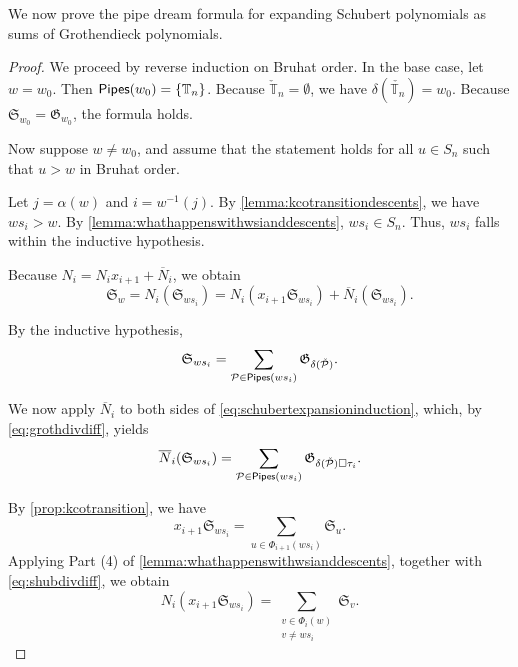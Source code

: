 \documentclass[12 pt]{amsart}
\newcommand{\addable}{\alpha}
\numberwithin{equation}{section}
\theoremstyle{remark}
\newcommand{\pipes}{{\sf Pipes}}
\newcommand{\demprod}{\delta}
\newcommand{\divdiff}{N}
\newcommand{\kdivdiff}{\overline{N}}
\newcommand{\cotransitionperms}{\Phi}
\begin{document}
		We now prove the pipe dream formula for expanding Schubert polynomials as sums of Grothendieck polynomials.
		\thmpipeB*
		\begin{proof}
			We proceed by reverse induction on Bruhat order. 
			In the base case, let $w = w_0$.
			Then $\pipes(w_0)=\{\mathbb{T}_n\}$. Because $\check{\mathbb{T}}_n = \emptyset$, we have $\demprod(\check{\mathbb{T}_n})=w_0$. Because $\mathfrak{S}_{w_0}=\mathfrak{G}_{w_0}$, the formula holds.
			
			Now suppose $w \neq w_0$, and assume that the statement holds for all $u \in S_n$ such that $u > w$ in Bruhat order. 
			
					
			
			Let $j = \addable(w)$ and $i = w^{-1}(j)$. 
			By \cref{lemma:kcotransitiondescents}, we have $ws_i > w$. 
			By \cref{lemma:whathappenswithwsianddescents}, $ws_i\in S_n$. Thus, $ws_i$ falls within the inductive hypothesis.
			
			
			Because $\divdiff_i=\divdiff_i x_{i+1}+\kdivdiff_i$, we obtain
			\begin{equation}
				\label{eqn:writingoutdivideddiffapplication}
				\mathfrak{S}_w=\divdiff_i(\mathfrak{S}_{ws_i}) = \divdiff_i(x_{i + 1}\mathfrak{S}_{ws_i})+\kdivdiff_i(\mathfrak{S}_{ws_i}).
			\end{equation}
		
			By the inductive hypothesis,
			\begin{equation}
				\label{eq:schubertexpansioninduction}
				\mathfrak{S}_{ws_i} = \sum_{\mathcal{P} \in \pipes(ws_i)} \mathfrak{G}_{\demprod(\check{\mathcal{P}})}.
			\end{equation}
			
			We now apply $\kdivdiff_i$ to both sides of \cref{eq:schubertexpansioninduction}, which, by \cref{eq:grothdivdiff}, yields
			\begin{equation}
				\label{eq:KNi}
				\kdivdiff_i(\mathfrak{S}_{ws_i}) = \sum_{\mathcal{P} \in \pipes(ws_i)} \mathfrak{G}_{\demprod(\check{\mathcal{P}})\square \tau_i}.
			\end{equation}

			By \cref{prop:kcotransition}, we have
			\[x_{i + 1}\mathfrak{S}_{ws_i} = \sum_{u \in\cotransitionperms_{i + 1}(ws_i)} \mathfrak{S}_{u}.\]
			Applying Part (4) of \cref{lemma:whathappenswithwsianddescents}, together with \cref{eq:shubdivdiff}, we obtain 
			\[\divdiff_i(x_{i + 1}\mathfrak{S}_{ws_i}) = \sum_{\substack{v \in \cotransitionperms_i(w)\\v \neq ws_i}}\mathfrak{S}_v.\]
			

\end{proof}
\end{document}
